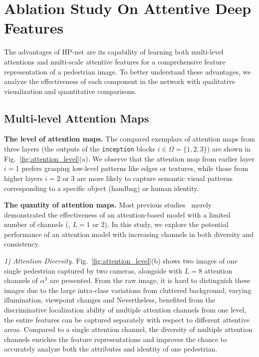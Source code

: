 \documentclass[10pt,twocolumn,letterpaper]{article}
\begin{document}
\section{Ablation Study On Attentive Deep Features}
\label{sec:ablation_study}

The advantages of HP-net are its capability of learning both multi-level attentions and multi-scale attentive features for a comprehensive feature representation of a pedestrian image.
To better understand these advantages, we analyze the effectiveness of each component in the network with qualitative visualization and quantitative comparisons.

\subsection{Multi-level Attention Maps}
\label{subsec:multi_level_attention_maps}

\noindent\textbf{The level of attention maps.}
The compared exemplars of attention maps from three layers (\ie the outputs of the \texttt{inception} blocks $i\in\Omega=\{1,2,3\}$) are shown in Fig.~\ref{fig:attention_level}(a).
We observe that the attention map from earlier layer $i=1$ prefers grasping low-level patterns like edges or textures, while those from higher layers $i=2$ or $3$ are more likely to capture semantic visual patterns corresponding to a specific object (\eg handbag) or human identity.

\noindent\textbf{The quantity of attention maps.}
Most previous studies~\cite{xu2015show,newell2016stacked} merely demonstrated the effectiveness of an attention-based model with a limited number of channels (\ie, $L=1$ or $2$).
In this study, we explore the potential performance of an attention model with increasing channels in both diversity and consistency.

\textit{1) Attention Diversity.}
Fig.~\ref{fig:attention_level}(b) shows two images of one single pedestrian captured by two cameras, alongside with $L=8$ attention channels of $\alpha^3$ are presented.
From the raw image, it is hard to distinguish these images due to the large intra-class variations from cluttered background, varying illumination, viewpoint changes and \etc
Nevertheless, benefited from the discriminative localization ability of multiple attention channels from one level, the entire features can be captured separately with respect to different attentive areas.
Compared to a single attention channel, the diversity of multiple attention channels enriches the feature representations and improves the chance to accurately analyze both the attributes and identity of one pedestrian.
\end{document}
